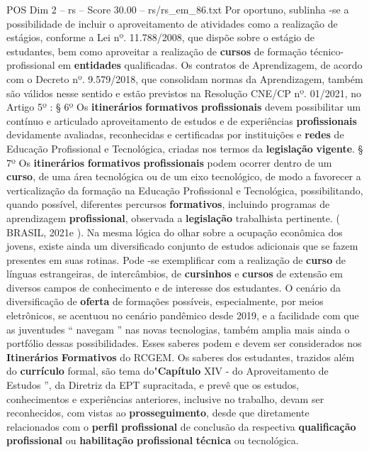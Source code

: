 \begin{textsample}{POS Dim 2 – rs – Score 30.00 – rs/rs\_em\_86.txt}
Por oportuno, sublinha -se a possibilidade de incluir o aproveitamento de atividades como a realização de estágios, conforme a Lei nº. 11.788/2008, que dispõe sobre o estágio de estudantes, bem como aproveitar a realização de \textbf{cursos} de formação técnico-profissional em \textbf{entidades} qualificadas.
Os contratos de Aprendizagem, de acordo com o Decreto nº. 9.579/2018, que consolidam normas da Aprendizagem, também são válidos nesse sentido e estão previstos na Resolução CNE/CP nº. 01/2021, no Artigo 5º : § 6º Os \textbf{itinerários} \textbf{formativos} \textbf{profissionais} devem possibilitar um contínuo e articulado aproveitamento de estudos e de experiências \textbf{profissionais} devidamente avaliadas, reconhecidas e certificadas por instituições e \textbf{redes} de Educação Profissional e Tecnológica, criadas nos termos da \textbf{legislação} \textbf{vigente}. § 7º Os \textbf{itinerários} \textbf{formativos} \textbf{profissionais} podem ocorrer dentro de um \textbf{curso}, de uma área tecnológica ou de um eixo tecnológico, de modo a favorecer a verticalização da formação na Educação Profissional e Tecnológica, possibilitando, quando possível, diferentes percursos \textbf{formativos}, incluindo programas de aprendizagem \textbf{profissional}, observada a \textbf{legislação} trabalhista pertinente. ( BRASIL, 2021e ).
Na mesma lógica do olhar sobre a ocupação econômica dos jovens, existe ainda um diversificado conjunto de estudos adicionais que se fazem presentes em suas rotinas.
Pode -se exemplificar com a realização de \textbf{curso} de línguas estrangeiras, de intercâmbios, de \textbf{cursinhos} e \textbf{cursos} de extensão em diversos campos de conhecimento e de interesse dos estudantes.
O cenário da diversificação de \textbf{oferta} de formações possíveis, especialmente, por meios eletrônicos, se acentuou no cenário pandêmico desde 2019, e a facilidade com que as juventudes “ navegam ” nas novas tecnologias, também amplia mais ainda o portfólio dessas possibilidades.
Esses saberes podem e devem ser considerados nos \textbf{Itinerários} \textbf{Formativos} do RCGEM.
Os saberes dos estudantes, trazidos além do \textbf{currículo} formal, são tema do"\textbf{Capítulo} XIV - do Aproveitamento de Estudos ”, da Diretriz da EPT supracitada, e prevê que os estudos, conhecimentos e experiências anteriores, inclusive no trabalho, devam ser reconhecidos, com vistas ao \textbf{prosseguimento}, desde que diretamente relacionados com o \textbf{perfil} \textbf{profissional} de conclusão da respectiva \textbf{qualificação} \textbf{profissional} ou \textbf{habilitação} \textbf{profissional} \textbf{técnica} ou tecnológica.

\end{textsample}

